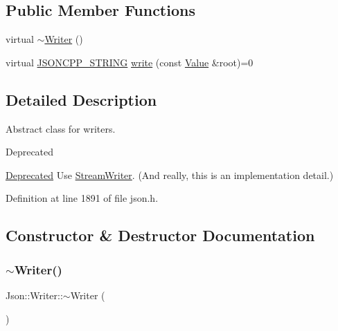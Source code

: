 \subsection*{Public Member Functions}
\begin{DoxyCompactItemize}
\item 
virtual \hyperlink{class_json_1_1_writer_a3e618564336f26b14921f0d840db668c}{$\sim$\+Writer} ()
\item 
virtual \hyperlink{json_8h_a1e723f95759de062585bc4a8fd3fa4be}{J\+S\+O\+N\+C\+P\+P\+\_\+\+S\+T\+R\+I\+NG} \hyperlink{class_json_1_1_writer_a61c55882b82c7651d0b9b683c6d3f371}{write} (const \hyperlink{class_json_1_1_value}{Value} \&root)=0
\end{DoxyCompactItemize}


\subsection{Detailed Description}
Abstract class for writers. 

\begin{DoxyRefDesc}{Deprecated}
\item[\hyperlink{deprecated__deprecated000007}{Deprecated}]Use \hyperlink{class_json_1_1_stream_writer}{Stream\+Writer}. (And really, this is an implementation detail.) \end{DoxyRefDesc}


Definition at line 1891 of file json.\+h.



\subsection{Constructor \& Destructor Documentation}
\mbox{\label{class_json_1_1_writer_a3e618564336f26b14921f0d840db668c}} 
\subsubsection{\texorpdfstring{$\sim$\+Writer()}{~Writer()}}
{\footnotesize\ttfamily Json\+::\+Writer\+::$\sim$\+Writer (\begin{DoxyParamCaption}{ }\end{DoxyParamCaption})\hspace{0.3cm}{\ttfamily [virtual]}}



